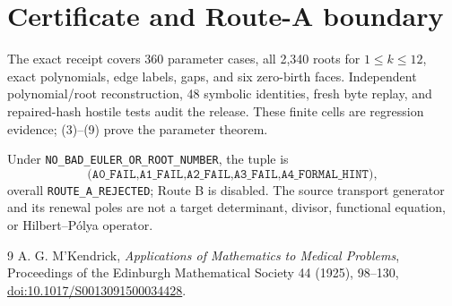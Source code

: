 \documentclass[10pt]{article}
\begin{document}
\section{Certificate and Route-A boundary}
The exact receipt covers 360 parameter cases, all 2,340 roots for
$1\le k\le12$, exact polynomials, edge labels, gaps, and six zero-birth
faces.  Independent polynomial/root reconstruction, 48 symbolic identities,
fresh byte replay, and repaired-hash hostile tests audit the release.  These
finite cells are regression evidence; (3)--(9) prove the parameter theorem.

Under \texttt{NO\_BAD\_EULER\_OR\_ROOT\_NUMBER}, the tuple is
\[
\texttt{(A0\_FAIL,A1\_FAIL,A2\_FAIL,A3\_FAIL,A4\_FORMAL\_HINT)},
\]
overall \texttt{ROUTE\_A\_REJECTED}; Route B is disabled.  The source
transport generator and its renewal poles are not a target determinant,
divisor, functional equation, or Hilbert--P\'olya operator.
\fi

\begin{thebibliography}{9}
 A. G. M'Kendrick,
\emph{Applications of Mathematics to Medical Problems},
Proceedings of the Edinburgh Mathematical Society 44 (1925), 98--130,
\href{https://doi.org/10.1017/S0013091500034428}{doi:10.1017/S0013091500034428}.
\end{thebibliography}
\end{document}
